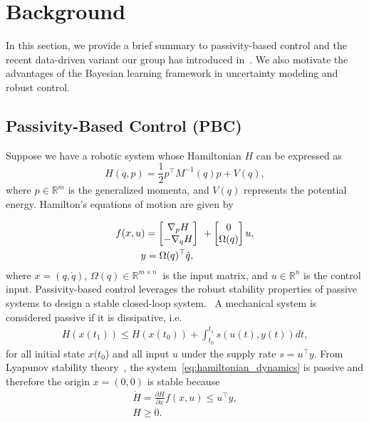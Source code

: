 \section{Background}

In this section, we provide a brief summary to passivity-based control and the
recent data-driven variant our group has introduced in~\cite{ashenafi2022robust,
acc, sirichotiyakul2022data}.
%
We also motivate the advantages of the Bayesian learning framework in
uncertainty modeling and robust control.
\subsection{Passivity-Based Control (PBC)}
\label{ssec:pbc}

Suppose we have a robotic system whose Hamiltonian $H$ can be expressed
as~
%
\begin{equation}
    H(q,p) = \frac{1}{2} p^\top M^{-1}(q) p + V(q),
    \label{eq:system_hamiltonian}
\end{equation}
%
where $p \in \mathbb{R}^m$ is the generalized momenta, and $V(q)$ represents the
potential energy. Hamilton's equations of motion are given by

\begin{align}
    \begin{split}  
      f(x, u) &= \bmat{\nabla_pH \\ -\nabla_qH}\ + \bmat{0 \\ \Omega(q)}u, \\
      &\hspace{-0.15cm} y = \Omega(q)^\top \dot{q},
    \end{split}
    \label{eq:hamiltonian_dynamics}
\end{align}
\noindent where $x = (q, \dot{q})$, $\Omega(q) \in \mathbb{R}^{m \times
n}~$ is
the input matrix, and $u \in \mathbb{R}^{n}$ is the control input.
%
%
Passivity-based control leverages the robust stability properties of passive
systems to design a stable closed-loop system.~
%
A mechanical system is considered passive if it is dissipative, i.e.
\begin{align}
  H(x(t_1)) \leq H(x(t_0)) + \int_{t_0}^{t_1} s(u(t), y(t)) dt,
\end{align}
\noindent for all initial state $x(t_0$) and all input $u$ under the
supply rate $s = u^\top y$.
%
From Lyapunov stability theory~, the system~\eqref{eq:hamiltonian_dynamics} is
passive and therefore the origin $x = (0, 0)$ is stable because~
\begin{equation*}
  \begin{gathered}
    \dot{H} = \frac{\partial H}{\partial x} f(x, u) \leq u^\top y, \\
    H \geq 0.
  \end{gathered}
\end{equation*}

